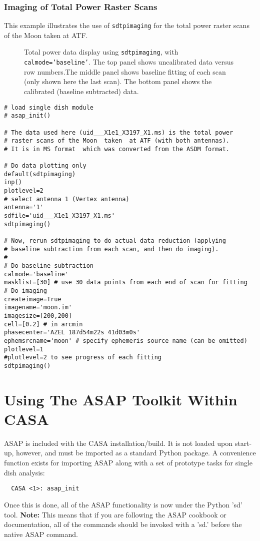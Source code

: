\subsubsection{Imaging of Total Power Raster Scans}
This example illustrates the use of {\tt sdtpimaging} for the total
power raster scans of the Moon taken at ATF.
\begin{figure}[h!]
\begin{center}
\caption{\label{fig:sdtpimaging} Total power data display using {\tt sdtpimaging}, 
with {\tt calmode='baseline'}. The top  panel shows uncalibrated data versus row numbers.The middle panel shows baseline fitting of each scan (only shown here the last
scan). The bottom panel shows the calibrated (baseline subtracted) data. }
\hrulefill
\end{center}
\end{figure}

\begin{verbatim}
# load single dish module
# asap_init()

# The data used here (uid___X1e1_X3197_X1.ms) is the total power 
# raster scans of the Moon  taken  at ATF (with both antennas). 
# It is in MS format  which was converted from the ASDM format.

# Do data plotting only
default(sdtpimaging)
inp()
plotlevel=2
# select antenna 1 (Vertex antenna) 
antenna='1'
sdfile='uid___X1e1_X3197_X1.ms'
sdtpimaging()

# Now, rerun sdtpimaging to do actual data reduction (applying
# baseline subtraction from each scan, and then do imaging).
#
# Do baseline subtraction 
calmode='baseline'
masklist=[30] # use 30 data points from each end of scan for fitting
# Do imaging 
createimage=True
imagename='moon.im'
imagesize=[200,200]
cell=[0.2] # in arcmin
phasecenter='AZEL 187d54m22s 41d03m0s'  
ephemsrcname='moon' # specify ephemeris source name (can be omitted)
plotlevel=1
#plotlevel=2 to see progress of each fitting
sdtpimaging()
\end{verbatim}


\section{Using The ASAP Toolkit Within CASA}
\label{section:sd.asap}

ASAP is included with the CASA installation/build. It is not loaded
upon start-up, however, and must be imported as a standard Python
package. A convenience function exists for importing ASAP along with
a set of prototype tasks for single dish analysis:
\small
\begin{verbatim}
  CASA <1>: asap_init
\end{verbatim}
\normalsize
Once this is done, all of the ASAP functionality is now under the
Python 'sd' tool.  {\bf Note:} This means that if you are following
the ASAP cookbook or documentation, all of the commands should be 
invoked with a 'sd.' before the native ASAP command.

